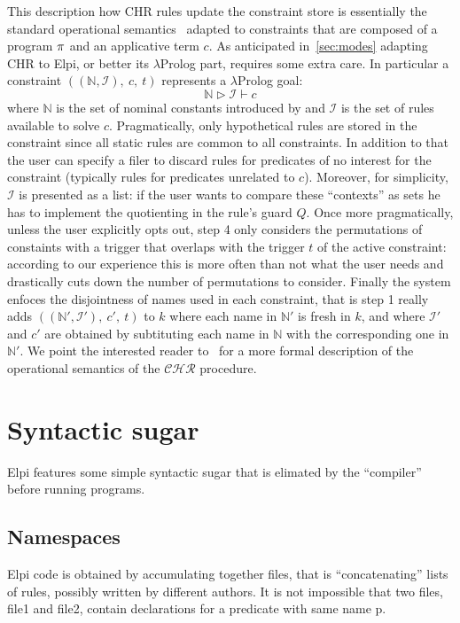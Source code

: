 \documentclass[a4paper, 11pt]{book}
\begin{document}
This description how CHR rules update the constraint store is
essentially the standard operational semantics~\cite{10.1007/978-3-540-27775-0_7}
adapted to constraints that are composed of a program ${\pi}$ and
an applicative term $c$. As anticipated in~\cref{sec:modes} adapting CHR to Elpi, or
better its $\lambda$Prolog part, requires some extra care. In particular
a constraint $((\mathbb{N},\mathcal{I}),\ c,\ t)$ represents a $\lambda$Prolog goal:
$$
\mathbb{N} \triangleright  \mathcal{I} \vdash c
$$
\noindent
where $\mathbb{N}$ is the set of nominal constants introduced by 
and $\mathcal{I}$ is the set of rules available to solve $c$.
Pragmatically, only hypothetical rules are stored in the constraint since all
static rules are common to all constraints. In addition to that the
user can specify a filer to discard rules for predicates of no interest for
the constraint (typically rules for predicates unrelated to $c$).
Moreover, for simplicity, $\mathcal{I}$ is presented as a list: if the
user wants to compare these ``contexts'' as sets he has to implement the
quotienting in the rule's guard $Q$. Once more pragmatically, unless
the user explicitly opts out, step 4 only considers the permutations of
constaints with a trigger that overlaps with the trigger $t$ of the active
constraint: according to our experience this is more often than not what
the user needs and drastically cuts down the number of permutations to consider.
Finally the system enfoces the disjointness of names used in each constraint, that
is step 1 really adds $((\mathbb{N'},\mathcal{I'}),\ c',\ t)$ to $k$
where each name in $\mathbb{N'}$ is fresh in $k$, and where
$\mathcal{I'}$ and $c'$ are obtained by subtituting each name in
$\mathbb{N}$ with the corresponding one in $\mathbb{N}'$.
We point the interested
reader to~\cite{TASSI_2019} for a more formal description of the
operational semantics of the $\mathcal{CHR}$ procedure.

\section{Syntactic sugar}

Elpi features some simple syntactic sugar that is elimated by
the ``compiler'' before running programs.

\subsection{Namespaces}

Elpi code is obtained by accumulating together files, that is
``concatenating'' lists of rules, possibly written by different
authors. It is not impossible that
two files, file1 and file2, contain declarations for a predicate with same name p.
\end{document}

